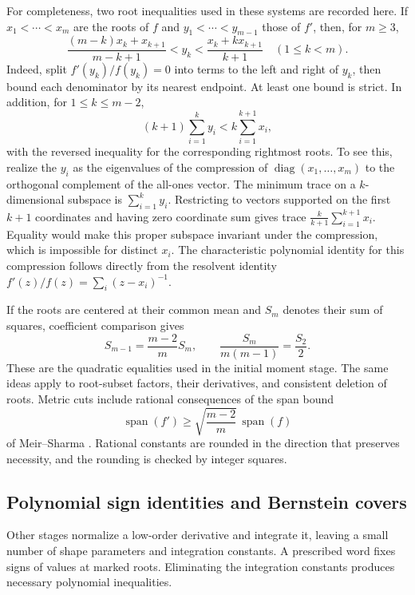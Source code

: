 \documentclass[11pt]{article}
\theoremstyle{definition}
\DeclareMathOperator{\spanop}{span}
\begin{document}
For completeness, two root inequalities used in these systems are recorded
here. If $x_1<\cdots<x_m$ are the roots of $f$ and
$y_1<\cdots<y_{m-1}$ those of $f'$, then, for $m\ge3$,
\begin{equation}\label{eq:rootcuts}
 \frac{(m-k)x_k+x_{k+1}}{m-k+1}<y_k<
 \frac{x_k+kx_{k+1}}{k+1}\quad(1\le k<m).
\end{equation}
Indeed, split $f'(y_k)/f(y_k)=0$ into terms to the left and right of
$y_k$, then bound each denominator by its nearest endpoint. At least one
bound is strict. In addition, for $1\le k\le m-2$,
\begin{equation}\label{eq:partialsum}
 (k+1)\sum_{i=1}^k y_i<k\sum_{i=1}^{k+1}x_i,
\end{equation}
with the reversed inequality for the corresponding rightmost roots.
To see this, realize the $y_i$ as the eigenvalues of the compression of
$\operatorname{diag}(x_1,\ldots,x_m)$ to the orthogonal complement of the
all-ones vector. The minimum trace on a $k$-dimensional subspace is
$\sum_{i=1}^k y_i$. Restricting to vectors supported on the first $k+1$
coordinates and having zero coordinate sum gives trace
$\frac{k}{k+1}\sum_{i=1}^{k+1}x_i$. Equality would make this proper
subspace invariant under the compression, which is impossible for
distinct $x_i$. The characteristic polynomial identity for this
compression follows directly from the resolvent identity
$f'(z)/f(z)=\sum_i(z-x_i)^{-1}$.

If the roots are centered at their common mean and $S_m$ denotes their
sum of squares, coefficient comparison gives
\begin{equation}\label{eq:moments}
 S_{m-1}=\frac{m-2}{m}S_m,
 \qquad\frac{S_m}{m(m-1)}=\frac{S_2}{2}.
\end{equation}
These are the quadratic equalities used in the initial moment stage.
The same ideas apply to root-subset factors, their derivatives, and
consistent deletion of roots. Metric cuts include rational consequences
of the span bound
\begin{equation}\label{eq:span}
 \spanop(f')\ge\sqrt{\frac{m-2}{m}}\,\spanop(f)
\end{equation}
of Meir--Sharma \cite{MeirSharma1968}. Rational constants are rounded in
the direction that preserves necessity, and the rounding is checked by
integer squares.

\subsection{Polynomial sign identities and Bernstein covers}
Other stages normalize a low-order derivative and integrate it, leaving a
small number of shape parameters and integration constants. A prescribed
word fixes signs of values at marked roots. Eliminating the integration
constants produces necessary polynomial inequalities.
\end{document}
